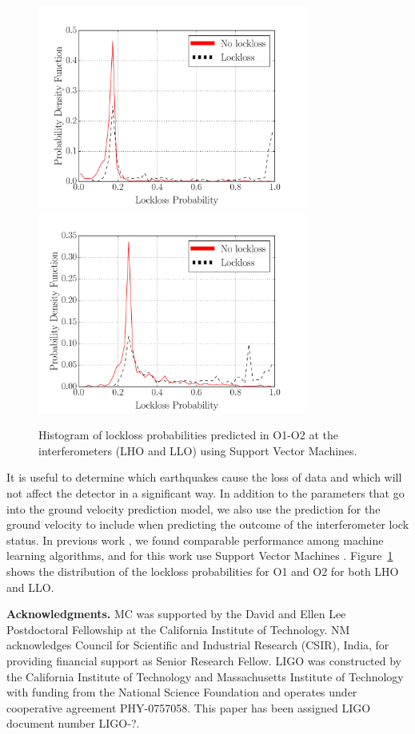\documentclass[preprint, aps, showpacs]{revtex4-1}
\begin{document}
\begin{figure}[t]
\hspace*{-0.5cm}
 \includegraphics[width=3.5in,trim = 2.5cm 1.5cm 2.5cm 1.5cm, clip=true]{lockloss_histogram_H1O1O2_GPR.pdf}
 \includegraphics[width=3.5in,trim = 2.5cm 1.5cm 2.5cm 1.5cm, clip=true]{lockloss_histogram_L1O1O2_GPR.pdf}
 \caption{Histogram of lockloss probabilities predicted in O1-O2 at the interferometers (LHO and LLO) using Support Vector Machines.}
 \label{fig:lockloss}
\end{figure}

It is useful to determine which earthquakes cause the loss of data and which will not affect the detector in a significant way.
In addition to the parameters that go into the ground velocity prediction model, we also use the prediction for the ground velocity to include when predicting the outcome of the interferometer lock status.
In previous work \cite{CoEa2017}, we found comparable performance among machine learning algorithms, and for this work use Support Vector Machines \cite{Burges_SVM}.
Figure~\ref{fig:lockloss} shows the distribution of the lockloss probabilities for O1 and O2 for both LHO and LLO. 

\textbf{Acknowledgments.}
MC was supported by the David and Ellen Lee Postdoctoral Fellowship at the California Institute of Technology.
NM acknowledges Council for Scientific and Industrial Research (CSIR), India, for providing financial support as Senior Research Fellow.  
LIGO was constructed by the California Institute of Technology and Massachusetts Institute of Technology with funding from the National Science Foundation and operates under cooperative agreement PHY-0757058.
This paper has been assigned LIGO document number LIGO-?.
\end{document}
